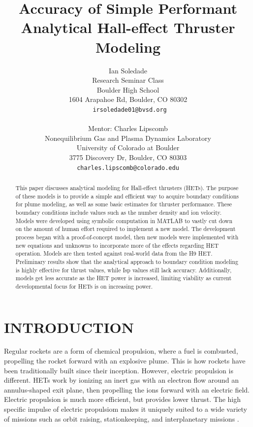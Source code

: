 \documentclass[letterpaper, 10 pt, conference]{ieeeconf}  %
\title{\LARGE \bf
Accuracy of Simple Performant Analytical Hall-effect Thruster Modeling
}
\author{Ian Soledade%
\\ Research Seminar Class \\
Boulder High School \\
1604 Arapahoe Rd, Boulder, CO 80302 \\
{\tt\small\ irsoledade01@bvsd.org} \\ \\
Mentor: Charles Lipscomb%
\\ Nonequilibrium Gas and Plasma Dynamics Laboratory \\
University of Colorado at Boulder \\
3775 Discovery Dr, Boulder, CO 80303 \\
{\tt\small charles.lipscomb@colorado.edu}
}
\begin{document}
\maketitle
\thispagestyle{plain}
\pagestyle{plain}



\begin{abstract}

This paper discusses analytical modeling for Hall-effect thrusters (HETs). The purpose of these models is to provide a simple and efficient way to acquire boundary conditions for plume modeling, as well as some basic estimates for thruster performance. These boundary conditions include values such as the number density and ion velocity. Models were developed using symbolic computation in MATLAB to vastly cut down on the amount of human effort required to implement a new model. The development process began with a proof-of-concept model, then new models were implemented with new equations and unknowns to incorporate more of the effects regarding HET operation. Models are then tested against real-world data from the H9 HET. Preliminary results show that the analytical approach to boundary condition modeling is highly effective for thrust values, while Isp values still lack accuracy. Additionally, models get less accurate as the HET power is increased, limiting viability as current developmental focus for HETs is on increasing power.\\

\end{abstract}

\section{INTRODUCTION}

Regular rockets are a form of chemical propulsion, where a fuel is combusted, propelling the rocket forward with an explosive plume. This is how rockets have been traditionally built since their inception. However, electric propulsion is different. HETs work by ionizing an inert gas with an electron flow around an annulus-shaped exit plane, then propelling the ions forward with an electric field. Electric propulsion is much more efficient, but provides lower thrust. The high specific impulse of electric propulsiom makes it uniquely suited to a wide variety of missions such as orbit raising, stationkeeping, and interplanetary missions \cite{c3}.
\end{document}
